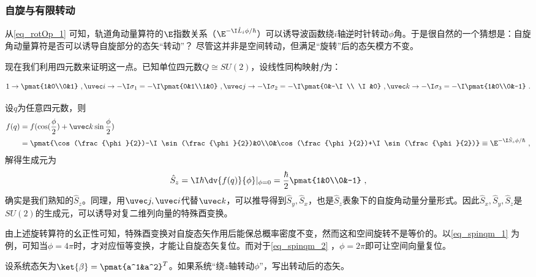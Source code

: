 \subsubsection{自旋与有限转动}

从\autoref{eq_rotOp_1} 可知，轨道角动量算符的$\E$指数关系（$\E^{-\I \hat L_i\phi/\hbar}$）可以诱导波函数绕$i$轴逆时针转动$\phi$角。于是很自然的一个猜想是：自旋角动量算符是否可以诱导自旋部分的态矢“转动”？ 尽管这并非是空间转动，但满足“旋转”后的态矢模方不变。

现在我们利用四元数来证明这一点。已知单位四元数$Q\cong SU(2)$，设线性同构映射$f$为：

\begin{equation}
1\rightarrow\pmat{1&0\\0&1}~,\uvec i\rightarrow-\I\sigma_1=-\I\pmat{0&1\\1&0}~,\uvec j\rightarrow -\I\sigma_2=-\I\pmat{0&-\I\\ \I&0}~,\uvec k\rightarrow -\I\sigma_3=-\I\pmat{1&0\\0&-1}~.
\end{equation}

设$q$为任意四元数，则
\begin{equation}\label{eq_spinqm_1}
\begin{aligned}
f(q)&=f(\cos(\frac{\phi}{2})+\uvec k \sin\frac{\phi}{2})\\
&=\pmat{\cos(\frac{\phi}{2})-\I \sin (\frac{\phi}{2})&0\\0&\cos(\frac{\phi}{2})+\I\sin (\frac{\phi}{2})}\equiv\E^{-\I \hat S_z \phi /\hbar}~,
\end{aligned}
\end{equation}
解得生成元为
\begin{equation}
\hat S_z=\I\hbar \dv{f(q)}{\phi}|_{\phi=0}=\frac{\hbar}{2}\pmat{1&0\\0&-1}~,
\end{equation}
确实是我们熟知的$\hat S_z$。同理，用$\uvec j,\uvec i$代替$\uvec k$，可以推导得到$\hat S_y,\hat S_x$，也是$\hat S_z$表象下的自旋角动量分量形式。因此$\hat S_x,\hat S_y,\hat S_z$是$SU(2)$的生成元，可以诱导对复二维列向量的特殊酉变换。

由上述旋转算符的幺正性可知，特殊酉变换对自旋态矢作用后能保总概率密度不变，然而这和空间旋转不是等价的。以\autoref{eq_spinqm_1} 为例，可知当$\phi=4\pi$时，才对应恒等变换，才能让自旋态矢复位。而对于\autoref{eq_spinqm_2} ，$\phi=2\pi$即可让空间向量复位。
\begin{exercise}{}
设系统态矢为$\ket{\beta}=\pmat{a^1&a^2}^T$。如果系统“绕$z$轴转动$\phi$”，写出转动后的态矢。
\end{exercise}
